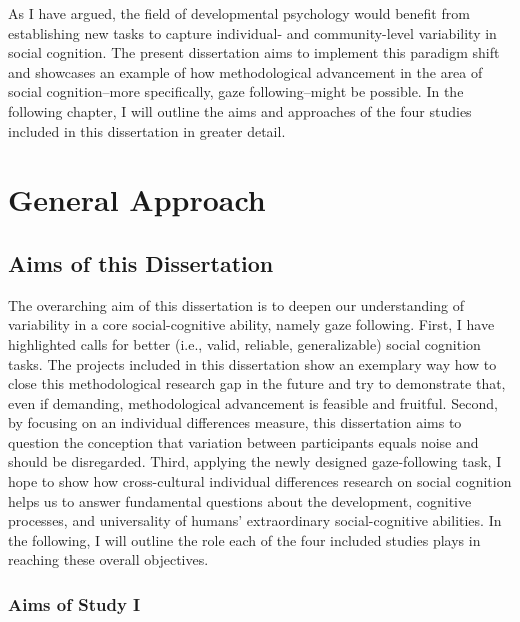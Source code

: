 \documentclass[
]{scrbook}
\begin{document}
As I have argued, the field of developmental psychology would benefit from establishing new tasks to capture individual- and community-level variability in social cognition. The present dissertation aims to implement this paradigm shift and showcases an example of how methodological advancement in the area of social cognition\thinspace --\thinspace more specifically, gaze following\thinspace --\thinspace might be possible. In the following chapter, I will outline the aims and approaches of the four studies included in this dissertation in greater detail.

\chapter{General Approach}\label{approach}

\section{Aims of this Dissertation}\label{aims-general}

The overarching aim of this dissertation is to deepen our understanding of variability in a core social-cognitive ability, namely gaze following. First, I have highlighted calls for better (i.e., valid, reliable, generalizable) social cognition tasks. The projects included in this dissertation show an exemplary way how to close this methodological research gap in the future and try to demonstrate that, even if demanding, methodological advancement is feasible and fruitful. Second, by focusing on an individual differences measure, this dissertation aims to question the conception that variation between participants equals noise and should be disregarded. Third, applying the newly designed gaze-following task, I hope to show how cross-cultural individual differences research on social cognition helps us to answer fundamental questions about the development, cognitive processes, and universality of humans' extraordinary social-cognitive abilities. In the following, I will outline the role each of the four included studies plays in reaching these overall objectives.

\subsection{Aims of Study I}\label{aims-studyI}
\end{document}
